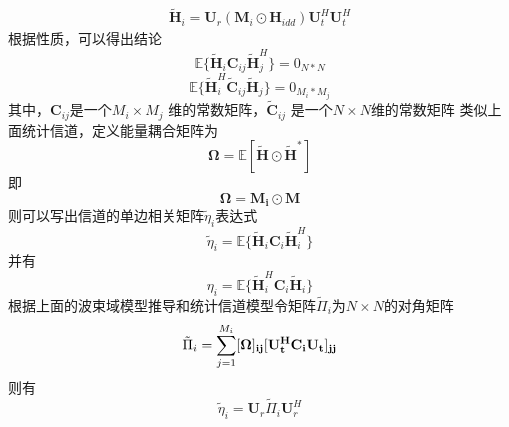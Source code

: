 \documentclass[bachelor,nocolorlinks, printoneside]{seuthesis} %
\begin{document}
\begin{Main}
\begin{gather}
\tilde{\mathbf{H}}_i = \mathbf{U}_{r}(\mathbf{M}_i\odot \mathbf{H}_{idd})\mathbf{U}_{t}^{H}\mathbf{U}_{t}^{H}
\end{gather}
根据性质，可以得出结论
\begin{equation}\label{key}
\mathbb{E} \lbrace \tilde{\mathbf{H}}_i \mathbf{C}_{ij} \tilde{\mathbf{H}}_j^{H} \rbrace = 0_{N*N}
\end{equation}
\begin{equation}\label{key}
\mathbb{E} \lbrace \tilde{\mathbf{H}}_i^{H} \tilde{\mathbf{C}}_{ij} \tilde{\mathbf{H}}_j \rbrace = 0_{M_i*M_j}
\end{equation}
其中，$\mathbf{C}_{ij}$是一个$M_i \times M_j$ 维的常数矩阵，$\tilde{\mathbf{C}}_{ij}$ 是一个$N \times N$维的常数矩阵
类似上面统计信道，定义能量耦合矩阵为
\begin{equation}\label{key}
\bm{\Omega} =\mathbb{E}[\tilde{\mathbf{H}} \odot \tilde{\mathbf{H}}^{*}]
\end{equation}
即
\begin{equation}\label{key}
\bm{\Omega} =\mathbf{M_i} \odot \mathbf{M}
\end{equation}
则可以写出信道的单边相关矩阵$\tilde{\eta}_i$表达式
\begin{equation}\label{key}
\tilde{\eta}_i = \mathbb{E} \lbrace \tilde{\mathbf{H}}_i \mathbf{C}_i \tilde{\mathbf{H}}_i^H \rbrace
\end{equation}
并有
\begin{equation}\label{key}
{\eta}_i = \mathbb{E} \lbrace \tilde{\mathbf{H}}_i^H \mathbf{C}_i \tilde{\mathbf{H}}_i \rbrace
\end{equation}
根据上面的波束域模型推导和统计信道模型令矩阵$\tilde{\Pi}_i$为$N \times N$的对角矩阵
\begin{equation}\label{key}
\tilde{\Pi}_i = \sum_{j=1}^{M_i}[\bf{\Omega}]_{ij}  [\mathbf{U}_t^H \mathbf{C}_i \mathbf{U}_t]_{jj}
\end{equation}
则有
\begin{equation}\label{key}
\tilde{\eta}_i = \mathbf{U}_r \tilde{\Pi}_i \mathbf{U}_r^H
\end{equation}




\end{Main}
\end{document}
